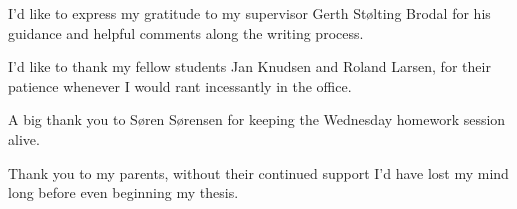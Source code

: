 I'd like to express my gratitude to my supervisor Gerth Stølting Brodal for his guidance and helpful comments along the writing process.

I'd like to thank my fellow students Jan Knudsen and Roland Larsen, for their patience whenever I would rant incessantly in the office.

A big thank you to Søren Sørensen for keeping the Wednesday  homework session alive.

Thank you to my parents, without their continued support I'd have lost my mind long before even beginning my thesis.